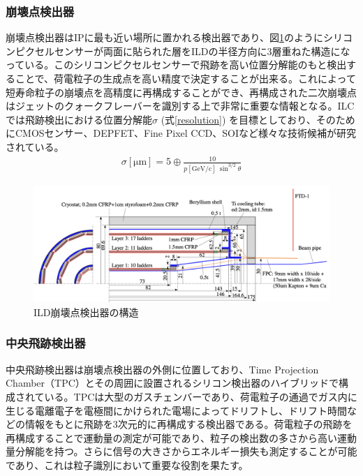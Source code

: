 \subsubsection{崩壊点検出器}
崩壊点検出器はIPに最も近い場所に置かれる検出器であり、図\ref{vertexdetector}のようにシリコンピクセルセンサーが両面に貼られた層をILDの半径方向に3層重ねた構造になっている。このシリコンピクセルセンサーで飛跡を高い位置分解能のもと検出することで、荷電粒子の生成点を高い精度で決定することが出来る。これによって短寿命粒子の崩壊点を高精度に再構成することができ、再構成された二次崩壊点はジェットのクォークフレーバーを識別する上で非常に重要な情報となる。ILCでは飛跡検出における位置分解能$\sigma$ (式\ref{resolution}) を目標としており、そのためにCMOSセンサー、DEPFET、Fine Pixel CCD、SOIなど様々な技術候補が研究されている\cite{tdr2}。
\begin{align}
\label{resolution}
\sigma [\mathrm{\mu m}] = 5 \oplus \frac{10} {p[\mathrm{GeV/c}] \ {\sin^{3/2}{\theta}}}
\end{align}
\begin{figure}[H]
	\begin{center}
 \includegraphics[keepaspectratio, scale=0.3]
 	{Figure/Introduction/vertexdetector.png}
 		\caption {ILD崩壊点検出器の構造}
 		\label{vertexdetector}
	\end{center}
\end{figure}
\subsubsection{中央飛跡検出器}
中央飛跡検出器は崩壊点検出器の外側に位置しており、Time Projection Chamber（TPC）とその周囲に設置されるシリコン検出器のハイブリッドで構成されている。TPCは大型のガスチェンバーであり、荷電粒子の通過でガス内に生じる電離電子を電極間にかけられた電場によってドリフトし、ドリフト時間などの情報をもとに飛跡を3次元的に再構成する検出器である。荷電粒子の飛跡を再構成することで運動量の測定が可能であり、粒子の検出数の多さから高い運動量分解能を持つ。さらに信号の大きさからエネルギー損失も測定することが可能であり、これは粒子識別において重要な役割を果たす。

